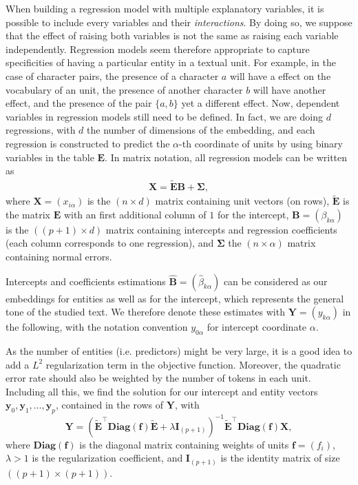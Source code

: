 \documentclass[
twocolumn,
]{ceurart}
\begin{document}
When building a regression model with multiple explanatory variables, it is possible to include every variables and their \emph{interactions}. By doing so, we suppose that the effect of raising both variables is not the same as raising each variable independently. Regression models seem therefore appropriate to capture specificities of having a particular entity in a textual unit. For example, in the case of character pairs, the presence of a character $a$ will have a effect on the vocabulary of an unit, the presence of another character $b$ will have another effect, and the presence of the pair $\{a, b\}$ yet a different effect. Now, dependent variables in regression models still need to be defined. In fact, we are doing $d$ regressions, with $d$ the number of dimensions of the embedding, and each regression is constructed to predict the $\alpha$-th coordinate of units by using binary variables in the table $\mathbf{E}$. In matrix notation, all regression models can be written as
\begin{align}
\mathbf{X} = \widetilde{\mathbf{E}} \mathbf{B} + \bm{\Sigma}, \label{cent_sol}
\end{align}
where $\mathbf{X} = (x_{i\alpha})$ is the $(n \times d)$ matrix containing unit vectors (on rows), $\widetilde{\mathbf{E}}$ is the matrix $\mathbf{E}$ with an first additional column of $1$ for the intercept, $\mathbf{B} = (\beta_{k\alpha})$ is the $((p+1) \times d)$ matrix containing intercepts and regression coefficients (each column corresponds to one regression), and $\mathbf{\Sigma}$ the $(n \times \alpha)$ matrix containing normal errors. 

Intercepts and coefficients estimations $\widehat{\mathbf{B}} = (\widehat{\beta}_{k\alpha})$ can be considered as our embeddings for entities as well as for the intercept, which represents the general tone of the studied text. We therefore denote these estimates with $\mathbf{Y} = (y_{k\alpha})$ in the following, with the notation convention $y_{0\alpha}$ for intercept coordinate $\alpha$. 

As the number of entities (i.e. predictors) might be very large, it is a good idea to add a $L^2$ regularization term in the objective function. Moreover, the quadratic error rate should also be weighted by the number of tokens in each unit. Including all this, we find the solution for our intercept and entity vectors $\mathbf{y}_0, \mathbf{y}_1, \ldots, \mathbf{y}_p$, contained in the rows of $\mathbf{Y}$, with 
\begin{equation}
\mathbf{Y} = (\widetilde{\mathbf{E}}^\top \textbf{Diag}(\mathbf{f}) \widetilde{\mathbf{E}} + \lambda \mathbf{I}_{(p+1)})^{-1} \widetilde{\mathbf{E}}^\top \textbf{Diag}(\mathbf{f}) \mathbf{X}, \label{reg_sol}
\end{equation}
where $\textbf{Diag}(\mathbf{f})$ is the diagonal matrix containing weights of units $\mathbf{f} = \left( f_i \right)$, $\lambda > 1$ is the regularization coefficient, and $\mathbf{I}_{(p+1)}$ is the identity matrix of size $((p+1) \times (p+1))$.
\end{document}

